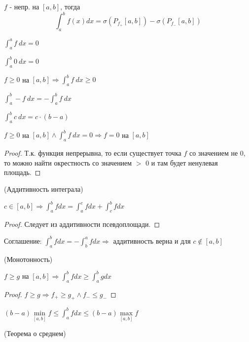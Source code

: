 \begin{definition}
    $f$ - непр. на $[a, b]$, тогда \\
    \[\int_a^b f(x) dx = \sigma(P_{f_+} [a, b]) - \sigma(P_{f_-}[a, b])\]
\end{definition}

\begin{properties}
    \item $\int_a^a f \ dx = 0$
    \item $\int_a^b 0 \  dx = 0$
    \item $f \geqslant 0$ на $[a, b] \Rightarrow \int_a^b f \ dx \geqslant 0$
    \item $\int_a^b - f \ dx = -\int_a^b f \ dx$
    \item $\int_a^b c \ dx = c \cdot (b - a)$
    \item $f \geqslant 0$ на $[a, b] \wedge \int_a^b f \ dx = 0 \Rightarrow f = 0$ на $[a, b]$
    \begin{proof}
        Т.к. функция непрерывна, то если существует точка $f$ со значением не 0,
            то можно найти окрестность со значением $>$ 0 и там будет ненулевая площадь.
    \end{proof}

    \item(Аддитивность интеграла) 
    
    $c \in [a, b] \Rightarrow \int_a^b f dx = 
    \int_a^c f dx +\int_c^b f dx$
    
    \begin{proof}
        Следует из аддитивности псевдоплощади.
    \end{proof}

    \begin{remark}
        Соглашение: $\int_a^b f dx = - \int_b^a f dx \Rightarrow$ аддитивность верна и 
        для $c \not \in [a, b]$
    \end{remark}

    \item (Монотонность) 
    
    $f \geqslant g$ на $[a ,b] \Rightarrow \int_a^b f dx \geqslant
    \int_a^b g dx$
    
    \begin{proof}
        $f \geqslant g \Rightarrow f_+ \geqslant g_+ \wedge f_- \leqslant g_-$
    \end{proof}

    \item $(b - a) \min\limits_{[a, b]} f \leqslant \int_a^b f dx \leqslant (b - a) \max\limits_{[a, b]} f$
    \item(Теорема о среднем) 
    

\end{properties}
